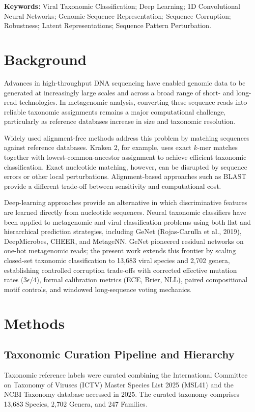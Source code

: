 \documentclass[11pt,a4paper]{article}
\begin{document}
\vspace{0.5em}
\noindent\textbf{Keywords:} Viral Taxonomic Classification; Deep Learning; 1D Convolutional Neural Networks; Genomic Sequence Representation; Sequence Corruption; Robustness; Latent Representations; Sequence Pattern Perturbation.

\section{Background}
Advances in high-throughput DNA sequencing have enabled genomic data to be generated at increasingly large scales and across a broad range of short- and long-read technologies. In metagenomic analysis, converting these sequence reads into reliable taxonomic assignments remains a major computational challenge, particularly as reference databases increase in size and taxonomic resolution.


Widely used alignment-free methods address this problem by matching sequences against reference databases. Kraken 2, for example, uses exact $k$-mer matches together with lowest-common-ancestor assignment to achieve efficient taxonomic classification. Exact nucleotide matching, however, can be disrupted by sequence errors or other local perturbations. Alignment-based approaches such as BLAST provide a different trade-off between sensitivity and computational cost.


Deep-learning approaches provide an alternative in which discriminative features are learned directly from nucleotide sequences. Neural taxonomic classifiers have been applied to metagenomic and viral classification problems using both flat and hierarchical prediction strategies, including GeNet (Rojas-Carulla et al., 2019), DeepMicrobes, CHEER, and MetageNN. GeNet pioneered residual networks on one-hot metagenomic reads; the present work extends this frontier by scaling closed-set taxonomic classification to 13,683 viral species and 2,702 genera, establishing controlled corruption trade-offs with corrected effective mutation rates ($3\epsilon/4$), formal calibration metrics (ECE, Brier, NLL), paired compositional motif controls, and windowed long-sequence voting mechanics.



\section{Methods}

\subsection{Taxonomic Curation Pipeline and Hierarchy}
Taxonomic reference labels were curated combining the International Committee on Taxonomy of Viruses (ICTV) Master Species List 2025 (MSL41) and the NCBI Taxonomy database accessed in 2025. The curated taxonomy comprises 13,683 Species, 2,702 Genera, and 247 Families.
\end{document}
